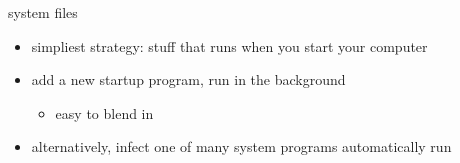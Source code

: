 \begin{frame}{system files}
    \begin{itemize}
    \item simpliest strategy: stuff that runs when you start your computer
    \item add a new startup program, run in the background
        \begin{itemize}
        \item easy to blend in
        \end{itemize}
    \vspace{.5cm}
    \item alternatively, infect one of many system programs automatically run
    \end{itemize}

\end{frame}


